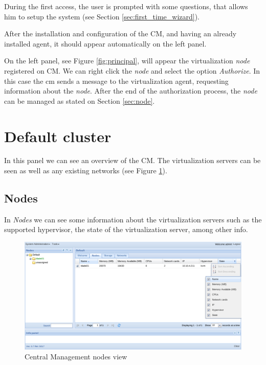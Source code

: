 During the first access, the user is prompted with some questions, that allows him to setup the system (see Section \ref{sec:first_time_wizard}).

After the installation and configuration of the CM, and having an already installed agent, it should appear automatically on the left panel.

On the left panel, see Figure \ref{fig:principal}, will appear the virtualization \emph{node} registered on CM. We can right click the \emph{node} and select the option \emph{Authorize}. In this case the cm sends a message to the virtualization agent, requesting information about the \emph{node}. After the end of the authorization process, the \emph{node} can be managed as stated on Section \ref{sec:node}.

\pagebreak

\section{Default cluster}

In this panel we can see an overview of the CM. The virtualization servers can be seen as well as any existing networks (see Figure \ref{fig:main_nodes}).

\subsection{Nodes}
\label{sub:nodes}

In \emph{Nodes} we can see some information about the virtualization servers such as the supported hypervisor, the state of the virtualization server, among other info.

\begin{figure}[H]
	\begin{center}
	\includegraphics[scale=0.45]{screenshots/main_nodes.png}
	\caption{Central Management nodes view}
	\label{fig:main_nodes}
	\end{center}
\end{figure}

